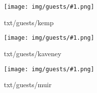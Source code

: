 \makeatletter
\newcommand{\goh}[1]{%
  \hspace{1em}
  \begin{minipage}{0.3\textwidth}
    \texttt{[image: img/guests/\#1.png]}
  \end{minipage}\hfill
  \begin{minipage}{0.62\textwidth}
    \def\gohname##1##2{\altf{\Large ##1 }##2}
    \expandafter\gohname\@@input txt/guests/#1
  \end{minipage}%
}
\makeatother
\vfill\goh{kemp}
\vfill\goh{kaveney}
\vfill\goh{muir}\vfill
